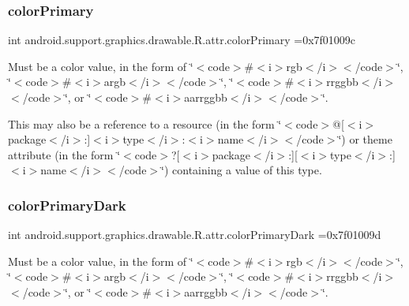 \subsubsection{\texorpdfstring{color\+Primary}{colorPrimary}}
{\footnotesize\ttfamily int android.\+support.\+graphics.\+drawable.\+R.\+attr.\+color\+Primary =0x7f01009c\hspace{0.3cm}{\ttfamily [static]}}

Must be a color value, in the form of \char`\"{}$<$code$>$\#$<$i$>$rgb$<$/i$>$$<$/code$>$\char`\"{}, \char`\"{}$<$code$>$\#$<$i$>$argb$<$/i$>$$<$/code$>$\char`\"{}, \char`\"{}$<$code$>$\#$<$i$>$rrggbb$<$/i$>$$<$/code$>$\char`\"{}, or \char`\"{}$<$code$>$\#$<$i$>$aarrggbb$<$/i$>$$<$/code$>$\char`\"{}. 

This may also be a reference to a resource (in the form \char`\"{}$<$code$>$@\mbox{[}$<$i$>$package$<$/i$>$\+:\mbox{]}$<$i$>$type$<$/i$>$\+:$<$i$>$name$<$/i$>$$<$/code$>$\char`\"{}) or theme attribute (in the form \char`\"{}$<$code$>$?\mbox{[}$<$i$>$package$<$/i$>$\+:\mbox{]}\mbox{[}$<$i$>$type$<$/i$>$\+:\mbox{]}$<$i$>$name$<$/i$>$$<$/code$>$\char`\"{}) containing a value of this type. \mbox{\label{classandroid_1_1support_1_1graphics_1_1drawable_1_1R_1_1attr_a0d45df04615602c93ed98a100b652b95}} 
\subsubsection{\texorpdfstring{color\+Primary\+Dark}{colorPrimaryDark}}
{\footnotesize\ttfamily int android.\+support.\+graphics.\+drawable.\+R.\+attr.\+color\+Primary\+Dark =0x7f01009d\hspace{0.3cm}{\ttfamily [static]}}

Must be a color value, in the form of \char`\"{}$<$code$>$\#$<$i$>$rgb$<$/i$>$$<$/code$>$\char`\"{}, \char`\"{}$<$code$>$\#$<$i$>$argb$<$/i$>$$<$/code$>$\char`\"{}, \char`\"{}$<$code$>$\#$<$i$>$rrggbb$<$/i$>$$<$/code$>$\char`\"{}, or \char`\"{}$<$code$>$\#$<$i$>$aarrggbb$<$/i$>$$<$/code$>$\char`\"{}. 

